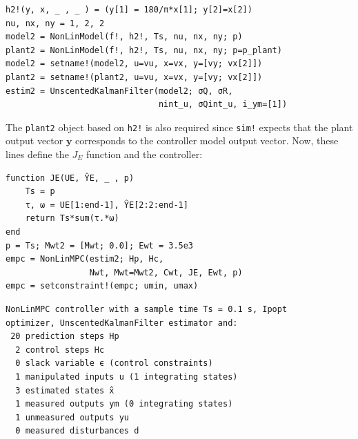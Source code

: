 \begin{verbatim}
h2!(y, x, _ , _ ) = (y[1] = 180/π*x[1]; y[2]=x[2])
nu, nx, ny = 1, 2, 2
model2 = NonLinModel(f!, h2!, Ts, nu, nx, ny; p)
plant2 = NonLinModel(f!, h2!, Ts, nu, nx, ny; p=p_plant)
model2 = setname!(model2, u=vu, x=vx, y=[vy; vx[2]])
plant2 = setname!(plant2, u=vu, x=vx, y=[vy; vx[2]])
estim2 = UnscentedKalmanFilter(model2; σQ, σR, 
                               nint_u, σQint_u, i_ym=[1])
\end{verbatim}
The \texttt{plant2} object based on \texttt{h2!} is also required since \texttt{sim!} expects that the plant output vector $\mathbf{y}$ corresponds to the controller model output vector. Now, these lines define the $J_E$ function and the controller:
\begin{verbatim}
function JE(UE, ŶE, _ , p)
    Ts = p
    τ, ω = UE[1:end-1], ŶE[2:2:end-1]
    return Ts*sum(τ.*ω)
end
p = Ts; Mwt2 = [Mwt; 0.0]; Ewt = 3.5e3
empc = NonLinMPC(estim2; Hp, Hc, 
                 Nwt, Mwt=Mwt2, Cwt, JE, Ewt, p)
empc = setconstraint!(empc; umin, umax)
\end{verbatim}
\spacerepl
\begin{verbatim}
NonLinMPC controller with a sample time Ts = 0.1 s, Ipopt
optimizer, UnscentedKalmanFilter estimator and:
 20 prediction steps Hp
  2 control steps Hc
  0 slack variable ϵ (control constraints)
  1 manipulated inputs u (1 integrating states)
  3 estimated states x̂
  1 measured outputs ym (0 integrating states)
  1 unmeasured outputs yu
  0 measured disturbances d
\end{verbatim}

